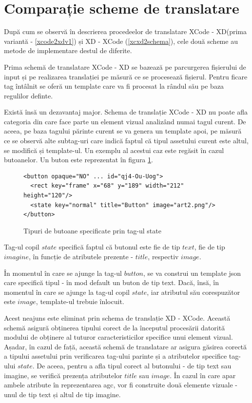 \section{Comparație scheme de translatare}

După cum se observă în descrierea procedeelor de translatare XCode - XD(prima variantă - \ref{xcode2xdv1}) și XD - XCode (\ref{xcxd2schema}), cele două scheme au metode de implementare destul de diferite. 

Prima schemă de translatare XCode - XD se bazează pe parcurgerea fișierului de input și pe realizarea translației pe măsură ce se procesează fișierul. Pentru ficare tag întâlnit se oferă un template care va fi procesat la rândul său pe baza regulilor definte. 

Există însă un dezavantaj major. Schema de translație XCode - XD nu poate afla categoria din care face parte un element vizual analizând numai tagul curent. De aceea, pe baza tagului părinte curent se va genera un template apoi, pe măsură ce se observă alte subtag-uri care indică faptul că tipul assetului curent este altul, se modifică și template-ul. Un exemplu al acestui caz este regăsit în cazul butoanelor. Un buton este reprezentat în figura \ref{fig:state}.

\begin{figure}[!htbp]
\lstset{language=XML}
\begin{lstlisting}
<button opaque="NO" ... id="qj4-Ou-Uog">
  <rect key="frame" x="68" y="189" width="212" height="120"/>
  <state key="normal" title="Button" image="art2.png"/>
</button>
\end{lstlisting}
\caption{Tipuri de butoane specificate prin tag-ul state} \label{fig:state}
\end{figure}

Tag-ul copil $state$ specifică faptul că butonul este fie de tip $text$, fie de tip $imagine$, în funcție de atributele prezente - $title$, respectiv $image$.

În momentul în care se ajunge la tag-ul $button$, se va construi un template json care specifică tipul - în mod default un buton de tip text. Dacă, însă, în momentul în care se ajunge la tag-ul copil $state$, iar atributul său corespuzător este $image$, template-ul trebuie înlocuit.

Acest neajuns este eliminat prin schema de translație XD - XCode. Această schemă asigură obținerea tipului corect de la începutul procesării datorită modului de obținere al tuturor caracteristicilor specifice unui element vizual. 
Așadar, în cazul de față, această schemă de translatare ar asigura găsirea corectă a tipului assetului prin verificarea tag-ului parinte și a atributelor specifice tag-ului $state$. De aceea, pentru a afla tipul corect al butonului - de tip text sau imagine, se verifică prezența atributelor $title$ sau $image$. În cazul în care apar ambele atribute în reprezentarea agc, vor fi construite două elemente vizuale - unul de tip text și altul de tip imagine. 

